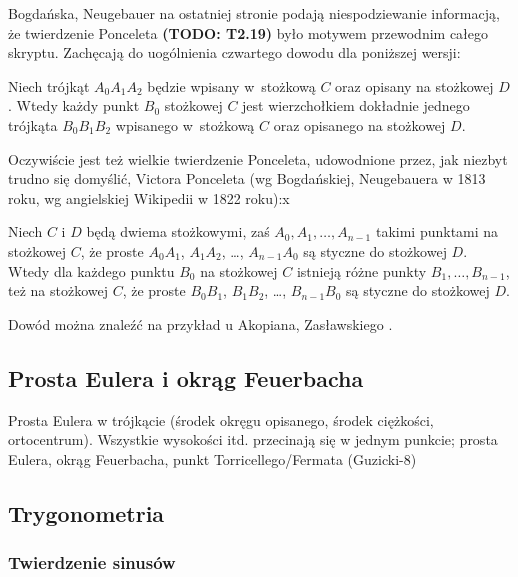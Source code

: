 Bogdańska, Neugebauer \cite[s. 267]{neugebauer_2018} na ostatniej stronie podają niespodziewanie informacją, że twierdzenie Ponceleta {\color{red}\textbf{(TODO: T2.19)}\color{black}} było motywem przewodnim całego skryptu.
Zachęcają do uogólnienia czwartego dowodu dla poniższej wersji:

\begin{theorem}
	Niech trójkąt $A_0 A_1 A_2$ będzie wpisany w~stożkową $C$ oraz opisany na stożkowej $D$.
	Wtedy każdy punkt $B_0$ stożkowej $C$ jest wierzchołkiem dokładnie jednego trójkąta $B_0 B_1 B_2$ wpisanego w~stożkową $C$ oraz opisanego na stożkowej $D$.
\end{theorem}

Oczywiście jest też wielkie twierdzenie Ponceleta, udowodnione przez, jak niezbyt trudno się domyślić, Victora Ponceleta \cite[s. 311-317]{poncelet_1865} (wg Bogdańskiej, Neugebauera w 1813 roku, wg angielskiej Wikipedii w 1822 roku):x

\begin{theorem}
	Niech $C$ i $D$ będą dwiema stożkowymi, zaś $A_0, A_1, \ldots, A_{n-1}$ takimi punktami na stożkowej $C$, że proste $A_0A_1$, $A_1A_2$, \ldots, $A_{n-1}A_0$ są styczne do stożkowej $D$.
	Wtedy dla każdego punktu $B_0$ na stożkowej $C$ istnieją różne punkty $B_1, \ldots, B_{n-1}$, też na stożkowej $C$, że proste $B_0B_1$, $B_1B_2$, \ldots, $B_{n-1}B_0$ są styczne do stożkowej $D$.
\end{theorem}

Dowód można znaleźć na przykład u Akopiana, Zasławskiego \cite[s. 93, 61, 67, 115, 124]{akopyan_2007}.


\subsection{Prosta Eulera i okrąg Feuerbacha}
Prosta Eulera w trójkącie (środek okręgu opisanego, środek ciężkości, ortocentrum).
Wszystkie wysokości itd. przecinają się w jednym punkcie; prosta Eulera, okrąg Feuerbacha, punkt Torricellego/Fermata (Guzicki-8)


\subsection{Trygonometria}

\subsubsection{Twierdzenie sinusów}

